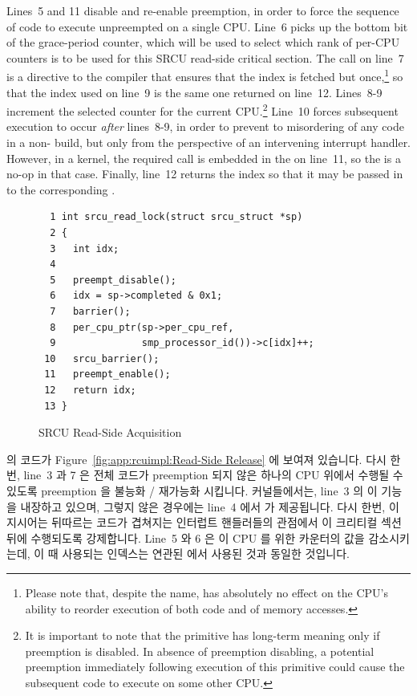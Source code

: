 Lines~5 and 11 disable and re-enable preemption, in order to force
the sequence of code to execute unpreempted on a single CPU.
Line~6 picks up the bottom bit of the grace-period counter, which will
be used to select which rank of per-CPU counters is to be used for this
SRCU read-side critical section.
The  call on line~7 is a directive to the compiler
that ensures that the index is
fetched but once,\footnote{
	Please note that, despite the name, 
	has absolutely no effect on the CPU's ability to
	reorder execution of both code and of memory accesses.}
so that the index used on line~9 is the same
one returned on line~12.
Lines~8-9 increment the selected counter for the current CPU.\footnote{
	It is important to note that the  primitive
	has long-term meaning only if preemption is disabled.
	In absence of preemption disabling, a potential preemption
	immediately following execution of this primitive could
	cause the subsequent code to execute on some other CPU.}
Line~10 forces subsequent execution to occur \emph{after}
lines~8-9, in order to prevent to misordering of any code
in a non- build, but only
from the perspective of an intervening interrupt handler.
However, in a  kernel, the required 
call is embedded in the  on line~11, so the
 is a no-op in that case.
Finally, line~12 returns the index so that it may be passed in to the
corresponding .
\fi

\begin{figure}[htbp]
{ \scriptsize
\begin{verbatim}
  1 int srcu_read_lock(struct srcu_struct *sp)
  2 {
  3   int idx;
  4
  5   preempt_disable();
  6   idx = sp->completed & 0x1;
  7   barrier();
  8   per_cpu_ptr(sp->per_cpu_ref,
  9               smp_processor_id())->c[idx]++;
 10   srcu_barrier();
 11   preempt_enable();
 12   return idx;
 13 }
\end{verbatim}
}
\caption{SRCU Read-Side Acquisition}
\label{fig:app:rcuimpl:Read-Side Acquisition}
\end{figure}

 의 코드가
Figure~\ref{fig:app:rcuimpl:Read-Side Release} 에 보여져 있습니다.
다시 한번, line~3 과 7 은 전체 코드가 preemption 되지 않은 하나의 CPU 위에서
수행될 수 있도록 preemption 을 불능화 / 재가능화 시킵니다.
 커널들에서는, line~3 의  이
 기능을 내장하고 있으며, 그렇지 않은 경우에는 line~4 에서
 가 제공됩니다.
다시 한번, 이 지시어는 뒤따르는 코드가 겹쳐지는 인터럽트 핸들러들의 관점에서 이
크리티컬 섹션 뒤에 수행되도록 강제합니다.
Line~5 와 6 은 이 CPU 를 위한 카운터의 값을 감소시키는데, 이 때 사용되는
인덱스는 연관된  에서 사용된 것과 동일한 것입니다.
\iffalse

